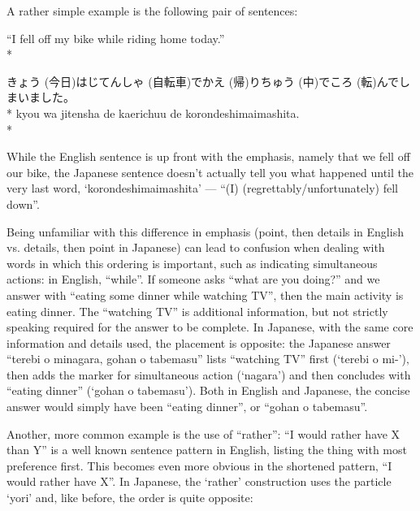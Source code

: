 \documentclass[11pt, b5paper, twoside, openright, onecolumn]{book}
\makeatletter
\newcommand*{\rubystack}[2]{{\relscale{0.5}%
  \begin{tabular}[b]{@{}c@{}}%
    {#1}\\%
   {\textscale{2}{#2}}%
  \end{tabular}}%
}
\DeclareRobustCommand*{\ruby}[2]{%
  \mbox{%
    \setlength{\parskip}{0ex}%
    \BeginAccSupp{method=pdfstringdef,ActualText={#1}}%
      \rubystack{\phantom{#2}}{#1}%
      \llap{%
        \rubystack{#2}{\phantom{#1}}%
      }%
    \EndAccSupp{}%
  }%
}
\renewcommand*{\ruby}[2]{#2 (#1)}%
\newenvironment{exampleblock}{
\setlength{\parindent}{0.6in}
\begin{minipage}[t]{\dimexpr\textwidth-\parindent}}
{\end{minipage}}
\makeatother
\begin{document}
A rather simple example is the following pair of sentences:

\vspace{0.4cm}
\begin{exampleblock}
“I fell off my bike while riding home today.” \\* 
\end{exampleblock}
\vspace{0.2cm}

\begin{exampleblock}
\ruby{今日}{きょう}は\ruby{自転車}{じてんしゃ}で\ruby{帰}{かえ}り\ruby{中}{ちゅう}で\ruby{転}{ころ}んでしまいました。 \\* 
kyou wa jitensha de kaerichuu de korondeshimaimashita. \\* 
\end{exampleblock}
\vspace{0.2cm}

While the English sentence is up front with the emphasis‚ namely that we fell off our bike‚ the Japanese sentence doesn’t actually tell you what happened until the very last word‚ ‘korondeshimaimashita’ — “(I) (regrettably/unfortunately) fell down”.

Being unfamiliar with this difference in emphasis (point‚ then details in English vs. details‚ then point in Japanese) can lead to confusion when dealing with words in which this ordering is important‚ such as indicating simultaneous actions: in English‚ “while”. If someone asks “what are you doing?” and we answer with “eating some dinner while watching TV”‚ then the main activity is eating dinner. The “watching TV” is additional information‚ but not strictly speaking required for the answer to be complete. In Japanese‚ with the same core information and details used‚ the placement is opposite: the Japanese answer “terebi o minagara‚ gohan o tabemasu” lists “watching TV” first (‘terebi o mi-’)‚ then adds the marker for simultaneous action (‘nagara’) and then concludes with “eating dinner” (‘gohan o tabemasu’). Both in English and Japanese‚ the concise answer would simply have been “eating dinner”‚ or “gohan o tabemasu”.

Another‚ more common example is the use of “rather”: “I would rather have X than Y” is a well known sentence pattern in English‚ listing the thing with most preference first. This becomes even more obvious in the shortened pattern‚ “I would rather have X”. In Japanese‚ the ‘rather’ construction uses the particle ‘yori’ and‚ like before‚ the order is quite opposite:
\end{document}
